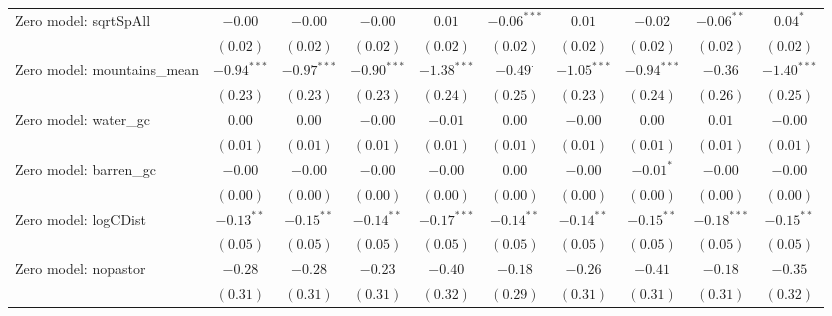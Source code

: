 \begin{center}
\begin{longtable}{l c c c c c c c c c}
Zero model: sqrtSpAll          & $-0.00$       & $-0.00$       & $-0.00$       & $0.01$        & $-0.06^{***}$   & $0.01$          & $-0.02$       & $-0.06^{**}$   & $0.04^{*}$    \\
                               & $(0.02)$      & $(0.02)$      & $(0.02)$      & $(0.02)$      & $(0.02)$        & $(0.02)$        & $(0.02)$      & $(0.02)$       & $(0.02)$      \\
Zero model: mountains\_mean    & $-0.94^{***}$ & $-0.97^{***}$ & $-0.90^{***}$ & $-1.38^{***}$ & $-0.49^{\cdot}$ & $-1.05^{***}$   & $-0.94^{***}$ & $-0.36$        & $-1.40^{***}$ \\
                               & $(0.23)$      & $(0.23)$      & $(0.23)$      & $(0.24)$      & $(0.25)$        & $(0.23)$        & $(0.24)$      & $(0.26)$       & $(0.25)$      \\
Zero model: water\_gc          & $0.00$        & $0.00$        & $-0.00$       & $-0.01$       & $0.00$          & $-0.00$         & $0.00$        & $0.01$         & $-0.00$       \\
                               & $(0.01)$      & $(0.01)$      & $(0.01)$      & $(0.01)$      & $(0.01)$        & $(0.01)$        & $(0.01)$      & $(0.01)$       & $(0.01)$      \\
Zero model: barren\_gc         & $-0.00$       & $-0.00$       & $-0.00$       & $-0.00$       & $0.00$          & $-0.00$         & $-0.01^{*}$   & $-0.00$        & $-0.00$       \\
                               & $(0.00)$      & $(0.00)$      & $(0.00)$      & $(0.00)$      & $(0.00)$        & $(0.00)$        & $(0.00)$      & $(0.00)$       & $(0.00)$      \\
Zero model: logCDist           & $-0.13^{**}$  & $-0.15^{**}$  & $-0.14^{**}$  & $-0.17^{***}$ & $-0.14^{**}$    & $-0.14^{**}$    & $-0.15^{**}$  & $-0.18^{***}$  & $-0.15^{**}$  \\
                               & $(0.05)$      & $(0.05)$      & $(0.05)$      & $(0.05)$      & $(0.05)$        & $(0.05)$        & $(0.05)$      & $(0.05)$       & $(0.05)$      \\
Zero model: nopastor           & $-0.28$       & $-0.28$       & $-0.23$       & $-0.40$       & $-0.18$         & $-0.26$         & $-0.41$       & $-0.18$        & $-0.35$       \\
                               & $(0.31)$      & $(0.31)$      & $(0.31)$      & $(0.32)$      & $(0.29)$        & $(0.31)$        & $(0.31)$      & $(0.31)$       & $(0.32)$      \\

\end{longtable}
\end{center}
